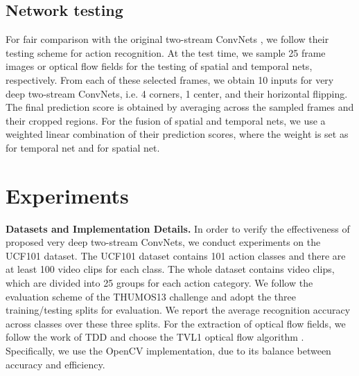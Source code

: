 \documentclass[10pt,twocolumn,letterpaper]{article}
\begin{document}
\begin{table*}
\begin{center}
\vspace{2mm}
\caption{Performance comparison of different architectures on the THUMOS15 \cite{THUMOS15} validation dataset. (from \cite{WangWXQ15}, {\bf without} using our proposed good practices)}
\label{tbl:result_thumos}
\end{center}
\end{table*}

\subsection{Network testing}

For fair comparison with the original two-stream ConvNets \cite{SimonyanZ14}, we follow their testing scheme for action recognition. At the test time, we sample 25 frame images or optical flow fields for the testing of spatial and temporal nets, respectively. From each of these selected frames, we obtain 10 inputs for very deep two-stream ConvNets, i.e. 4 corners, 1 center, and their horizontal flipping. The final prediction score is obtained by averaging across the sampled frames and their cropped regions. For the fusion of spatial and temporal nets, we use a weighted linear combination of their prediction scores, where the weight is set as  for temporal net and  for spatial net.

\section{Experiments}
\label{sec:experiment}

{\bf Datasets and Implementation Details.} In order to verify the effectiveness of proposed very deep two-stream ConvNets, we conduct experiments on the UCF101 \cite{Soomro12} dataset. The UCF101 dataset contains 101 action classes and there are at least 100 video clips for each class. The whole dataset contains  video clips, which are divided into 25 groups for each action category. We follow the evaluation scheme of the THUMOS13 challenge \cite{THUMOS13} and adopt the three training/testing splits for evaluation. We report the average recognition accuracy across classes over these three splits. For the extraction of optical flow fields, we follow the work of TDD \cite{WangQT15a} and choose the TVL1 optical flow algorithm \cite{ZachPB07}. Specifically, we use the OpenCV implementation, due to its balance between accuracy and efficiency.
\end{document}
